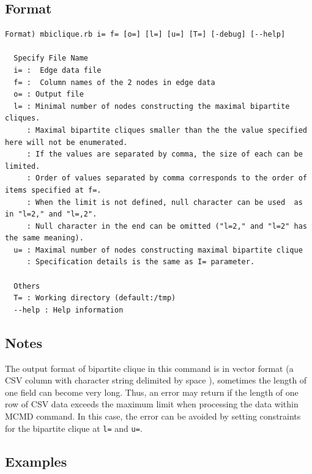 \subsection{Format}
\begin{verbatim}
Format) mbiclique.rb i= f= [o=] [l=] [u=] [T=] [-debug] [--help]

  Specify File Name
  i= :  Edge data file 
  f= :  Column names of the 2 nodes in edge data
  o= : Output file
  l= : Minimal number of nodes constructing the maximal bipartite cliques.
     : Maximal bipartite cliques smaller than the the value specified here will not be enumerated. 
     : If the values are separated by comma, the size of each can be limited. 
     : Order of values separated by comma corresponds to the order of items specified at f=. 
     : When the limit is not defined, null character can be used  as in "l=2," and "l=,2".
     : Null character in the end can be omitted ("l=2," and "l=2" has the same meaning).
  u= : Maximal number of nodes constructing maximal bipartite clique 
     : Specification details is the same as I= parameter. 

  Others
  T= : Working directory (default:/tmp)
  --help : Help information 
\end{verbatim}

\subsection{Notes}
The output format of bipartite clique in this command is in vector format (a CSV column with character string delimited by space ), sometimes the length of one field can become very long.  
Thus, an error may return if the length of one row of CSV data exceeds the maximum limit when processing the data within MCMD command. 
In this case, the error can be avoided by setting constraints for the bipartite clique at  \verb|l=| and \verb|u=|. 


\subsection{Examples}


